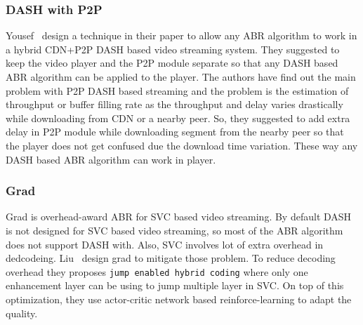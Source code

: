 \subsubsection{DASH with P2P}
Yousef \etal\ design a technique in their paper \cite{10.1145/3339825.3391859} to allow any ABR algorithm to work in a hybrid CDN+P2P DASH based video streaming system. They suggested to keep the video player and the P2P module separate so that any DASH based ABR algorithm can be applied to the player. The authors have find out the main problem with P2P DASH based streaming and the problem is the estimation of throughput or buffer filling rate as the throughput and delay varies drastically while downloading from CDN or a nearby peer. So, they suggested to add extra delay in P2P module while downloading segment from the nearby peer so that the player does not get confused due the download time variation. These way any DASH based ABR algorithm can work in player.

\subsubsection{Grad}
Grad\cite{10.1145/3394171.3413512} is overhead-award ABR for SVC based video streaming. By default DASH is not designed for SVC based video streaming, so most of the ABR algorithm does not support DASH with. Also, SVC involves lot of extra overhead in dedcodeing. Liu \etal\ design grad to mitigate those problem. To reduce decoding overhead they proposes {\tt jump enabled hybrid coding} where only one enhancement layer can be using to jump multiple layer in SVC. On top of this optimization, they use actor-critic network based reinforce-learning to adapt the quality.
